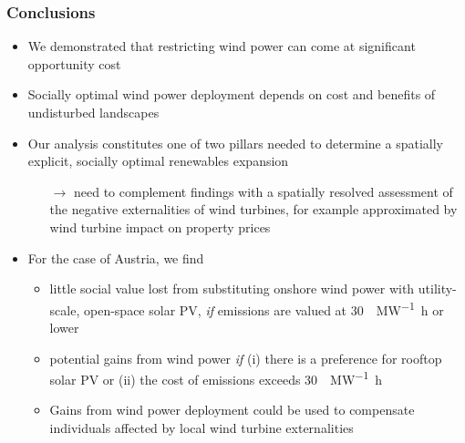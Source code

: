 \documentclass[aspectratio=1610, xcolor=dvipsnames,handout]{beamer} %
\begin{document}
\begin{frame}
    \frametitle{Conclusions}
    \begin{itemize}
        \item We demonstrated that restricting wind power can come at significant opportunity cost
        \item Socially optimal wind power deployment depends on cost and benefits of undisturbed landscapes
        \item Our analysis constitutes one of two pillars needed to determine a spatially explicit, socially
        optimal renewables expansion
        \begin{itemize}
            \item[$\rightarrow$] need to complement findings with a spatially resolved assessment of the negative
            externalities of wind turbines, for example approximated by wind turbine impact on property prices
        \end{itemize}
        \medskip
        \item For the case of Austria, we find
        \begin{itemize}
            \item little social value lost from substituting onshore wind power with utility-scale, open-space solar PV,
            \emph{if}  emissions are valued at \SI{30}{\text{\euro}\per\mega\watt\hour} or lower
            \item potential gains from wind power \emph{if} (i) there is a preference for rooftop solar PV or (ii)
            the cost of  emissions exceeds \SI{30}{\text{\euro}\per\mega\watt\hour}
            \item Gains from wind power deployment could be used to compensate individuals affected by local wind turbine
            externalities
        \end{itemize}
    \end{itemize}
\end{frame}
\end{document}
